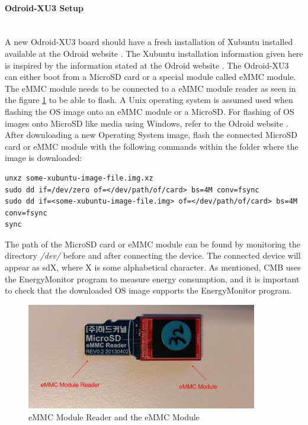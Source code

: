 \paragraph*{Odroid-XU3 Setup} \hfill \\
A new Odroid-XU3 board should have a fresh installation of Xubuntu installed available at the Odroid website \cite{m:odroid}. The Xubuntu installation information given here is inspired by the information stated at the Odroid website \cite{m:odroid-i}. The Odroid-XU3 can either boot from a MicroSD card or a special module called eMMC module. The eMMC module needs to be connected to a eMMC module reader as seen in the figure \ref{fig:emmc} to be able to flash. A Unix operating system is assumed used when flashing the OS image onto an eMMC module or a MicroSD. For flashing of OS images onto MicroSD like media using Windows, refer to the Odroid website \cite{m:odroid}. After downloading a new Operating System image, flash the connected MicroSD card or eMMC module with the following commands within the folder where the image is downloaded:
\begin{lstlisting}
unxz some-xubuntu-image-file.img.xz
sudo dd if=/dev/zero of=</dev/path/of/card> bs=4M conv=fsync
sudo dd if=<some-xubuntu-image-file.img> of=</dev/path/of/card> bs=4M conv=fsync
sync
\end{lstlisting}
The path of the MicroSD card or eMMC module can be found by monitoring the directory \textit{/dev/} before and after connecting the device. The connected device will appear as sdX, where X is some alphabetical character. As mentioned, CMB uses the EnergyMonitor program to measure energy consumption, and it is important to check that the downloaded OS image supports the EnergyMonitor program.\\

\begin{figure}
    \centering
    \includegraphics[width=0.9\textwidth, height=0.4\textwidth]{figs/emmc.jpg}
    \caption[eMMC Module Reader and the eMMC Module]{eMMC Module Reader and the eMMC Module}
    \label{fig:emmc}
\end{figure}

